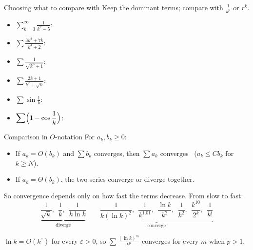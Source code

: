 \documentclass{wosm-slides}
\begin{document}
\begin{frame}{Choosing what to compare with}
  Keep the dominant terms; compare with $\frac{1}{k^p}$ or $r^k$.
  \begin{itemize}
    \item $\displaystyle\sum_{k=3}^\infty \frac{1}{k^2 - 5}$:
    \item $\displaystyle\sum \frac{3k^2 + 7k}{k^4 + 2}$:
    \item $\displaystyle\sum \frac{1}{\sqrt{k^3 + 1}}$:
    \item $\displaystyle\sum \frac{2k + 1}{k^2 + \sqrt{k}}$:
    \item $\displaystyle\sum \sin\frac1k$:
    \item $\displaystyle\sum \Bigl(1 - \cos\frac1k\Bigr)$:
  \end{itemize}
\end{frame}

\begin{frame}{Comparison in $O$-notation}
  For $a_k, b_k \ge 0$:
  \begin{itemize}
    \item If $a_k = O(b_k)$ and $\sum b_k$ converges, then $\sum a_k$ converges \
      ($a_k \le C b_k$ for $k \ge N$).
    \item If $a_k = \Theta(b_k)$, the two series converge or diverge together.
  \end{itemize}
  So convergence depends only on how fast the terms decrease. From slow to fast:
  \[ \underbrace{\frac{1}{\sqrt k},\ \ \frac1k,\ \ \frac{1}{k \ln k}}_{\text{diverge}}
     \qquad
     \underbrace{\frac{1}{k (\ln k)^2},\ \ \frac{1}{k^{1.01}},\ \ \frac{\ln k}{k^2},\ \
       \frac{1}{k^2},\ \ \frac{k^{10}}{2^k},\ \ \frac{1}{k!}}_{\text{converge}} \]
  \pause
  \begin{remark}
    $\ln k = O(k^\varepsilon)$ for every $\varepsilon > 0$, so
    $\sum \frac{(\ln k)^m}{k^p}$ converges for every $m$ when $p > 1$.
  \end{remark}
\end{frame}
\end{document}
